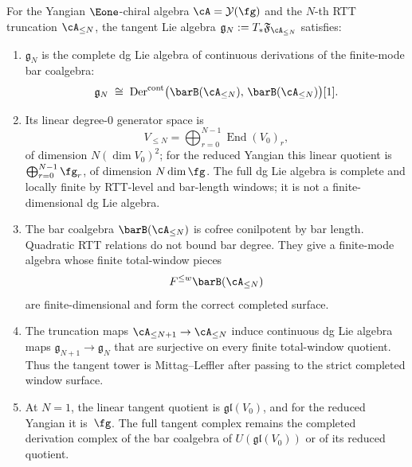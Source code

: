 \begin{proposition}
\label{prop:finite-stage-tangent}
For the Yangian $\Eone$-chiral algebra
$\cA = \mathcal{Y}(\fg)$ and the $N$-th RTT truncation
$\cA_{\leq N}$, the tangent Lie algebra
$\mathfrak{g}_N := T_{*}\mathfrak{F}_{\cA_{\leq N}}$
satisfies:
\begin{enumerate}[label=\textup{(\alph*)}]
\item $\mathfrak{g}_N$ is the complete dg Lie algebra of continuous
 derivations of the finite-mode bar coalgebra:
 \[
 \mathfrak{g}_N
 \;\cong\;
 \operatorname{Der}^{\mathrm{cont}}\bigl(
 \barB(\cA_{\leq N}),\, \barB(\cA_{\leq N})
 \bigr)[1].
 \]
\item Its linear degree-$0$ generator space is
 \[
 V_{\leq N}=\bigoplus_{r=0}^{N-1}\operatorname{End}(V_0)_r,
 \]
 of dimension $N(\dim V_0)^2$; for the reduced Yangian this linear
 quotient is $\bigoplus_{r=0}^{N-1}\fg_r$, of dimension
 $N\dim\fg$. The full dg Lie algebra is complete and locally finite
 by RTT-level and bar-length windows; it is not a finite-dimensional
 dg Lie algebra.
\item The bar coalgebra $\barB(\cA_{\leq N})$ is cofree
 conilpotent by bar length. Quadratic RTT relations do not bound bar
 degree. They give a finite-mode algebra whose finite
 total-window pieces
 \[
 F^{\leq w}\barB(\cA_{\leq N})
 \]
 are finite-dimensional and form the correct completed surface.
\item The truncation maps $\cA_{\leq N+1} \to \cA_{\leq N}$
 induce continuous dg Lie algebra maps
 $\mathfrak{g}_{N+1}\to\mathfrak{g}_N$ that are surjective on every
 finite total-window quotient. Thus the tangent tower is
 Mittag--Leffler after passing to the strict completed window
 surface.
\item At $N = 1$, the linear tangent quotient is
 $\mathfrak{gl}(V_0)$, and for the reduced Yangian it is~$\fg$.
 The full tangent complex remains the completed derivation complex of
 the bar coalgebra of $U(\mathfrak{gl}(V_0))$ or of its reduced
 quotient.
\end{enumerate}
\end{proposition}

